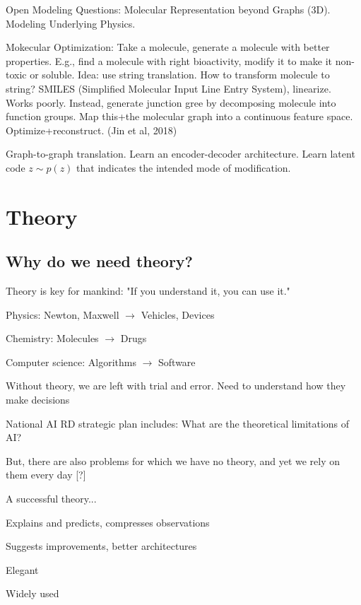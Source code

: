 \documentclass[english]{article}
\begin{document}
Open Modeling Questions: Molecular Representation beyond Graphs (3D). Modeling Underlying Physics.

Mokecular Optimization: Take a molecule, generate a molecule with better properties. E.g., find a molecule with right bioactivity, modify it to make it non-toxic or soluble. Idea: use string translation. How to transform molecule to string? SMILES (Simplified Molecular Input Line Entry System), linearize. Works poorly. Instead, generate junction gree by decomposing molecule into function groups.  Map this+the molecular graph into a continuous feature space. Optimize+reconstruct. (Jin et al, 2018)

Graph-to-graph translation. Learn an encoder-decoder architecture. Learn latent code $z\sim p(z)$ that indicates the intended mode of modification.


\eenum


\section{Theory}
%
\subsection{Why do we need theory?}
%
\bitem
\item Theory is key for mankind: "If you understand it, you can use it."
\bitem
\item Physics: Newton, Maxwell $\to$ Vehicles, Devices
\item Chemistry: Molecules $\to$ Drugs
\item Computer science: Algorithms $\to$ Software
\eitem
\item Without theory, we are left with trial and error. Need to understand how they make decisions


\item National AI RD strategic plan includes: What are the theoretical limitations of AI? 
\item But, there are also problems for which we have no theory, and yet we rely on them every day [?]
\item A successful theory...
\bitem
\item Explains and predicts, compresses observations
\item Suggests improvements, better architectures
\item Elegant
\item Widely used %

\eitem
\end{document}
